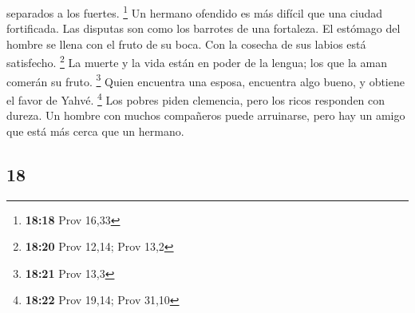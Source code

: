 \begin{paracol}{2}
separados a los fuertes. \footnote{\textbf{18:18} Prov 16,33}
 Un hermano ofendido es más difícil que una ciudad
fortificada. Las disputas son como los barrotes de una fortaleza.
 El estómago del hombre se llena con el fruto de su boca.
Con la cosecha de sus labios está satisfecho. \footnote{\textbf{18:20}
  Prov 12,14; Prov 13,2}  La muerte y la vida están en
poder de la lengua; los que la aman comerán su fruto. \footnote{\textbf{18:21}
  Prov 13,3}  Quien encuentra una esposa, encuentra algo
bueno, y obtiene el favor de Yahvé. \footnote{\textbf{18:22} Prov 19,14;
  Prov 31,10}  Los pobres piden clemencia, pero los ricos
responden con dureza.  Un hombre con muchos compañeros
puede arruinarse, pero hay un amigo que está más cerca que un hermano.

\switchcolumn
\begin{otherlanguage}{english}

\hypertarget{section-35}{%
\section{18}\label{section-35}}


\end{otherlanguage}
\end{paracol}
